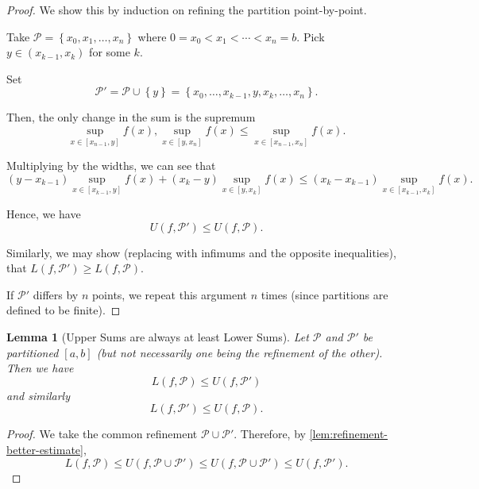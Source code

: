 \documentclass[11pt]{article}
\numberwithin{equation}{section}
\newtheorem{lemma}[theorem]{Lemma}
\theoremstyle{definition}
\theoremstyle{remark}
\newcommand{\pqty}[1]{\left(#1\right)}
\newcommand{\Bqty}[1]{\left\{#1\right\}}
\newcommand{\ccintv}[2]{[#1,#2]}
\newcommand{\oointv}[2]{(#1,#2)}
\newcommand{\partition}{\mathcal P}
\newcommand{\upperSum}{U}
\newcommand{\lowerSum}{L}
\begin{document}
\begin{proof}
    We show this by induction on refining the partition point-by-point.
    
    Take \(\partition = \Bqty{x_0, x_1, \ldots, x_n}\) where \(0 = x_0 < x_1 < \cdots < x_n = b\). Pick \(y \in \oointv{x_{k - 1}}{x_k}\) for some \(k\).

    Set
    \[
        \partition' = \partition \cup \Bqty{y} = \Bqty{x_0, \ldots, x_{k - 1}, y, x_k, \ldots, x_n}.
    \]

    Then, the only change in the sum is the supremum
    \[
        \sup_{x \in \ccintv{x_{n - 1}}{y}} f\pqty{x}, \sup_{x \in \ccintv{y}{x_n}} f\pqty{x} \leq \sup_{x \in \ccintv{x_{n - 1}}{x_n}} f\pqty{x}.
    \]

    Multiplying by the widths, we can see that
    \[
        \pqty{y - x_{k - 1}} \sup_{x \in \ccintv{x_{k - 1}}{y}} f\pqty{x} + \pqty{x_k - y} \sup_{x \in \ccintv{y}{x_k}} f\pqty{x} \leq \pqty{x_k - x_{k - 1}} \sup_{x \in \ccintv{x_{k - 1}}{x_k}} f\pqty{x}.
    \]

    Hence, we have
    \[
        \upperSum\pqty{f, \partition'} \leq \upperSum \pqty{f, \partition}.
    \]

    Similarly, we may show (replacing with infimums and the opposite inequalities), that
    \(
        \lowerSum\pqty{f, \partition'} \geq \lowerSum \pqty{f, \partition}.
    \)

    If \(\partition'\) differs by \(n\) points, we repeat this argument \(n\) times (since partitions are defined to be finite).
\end{proof}

\begin{lemma}[Upper Sums are always at least Lower Sums]\label{analysis-unit-0145}
    \label{lem:upper-greater-lower-sum}%
    Let \(\partition\) and \(\partition'\) be partitioned \(\ccintv{a}{b}\) (but not necessarily one being the refinement of the other). Then we have
    \[
        \lowerSum\pqty{f, \partition} \leq \upperSum\pqty{f, \partition'}
    \]
    and similarly
    \[
        \lowerSum\pqty{f, \partition'} \leq \upperSum\pqty{f, \partition}.
    \]
\end{lemma}

\begin{proof}
    We take the common refinement \(\partition \cup \partition'\). Therefore, by \autoref{lem:refinement-better-estimate},
    \[
        \lowerSum\pqty{f, \partition} \leq \upperSum\pqty{f, \partition \cup \partition'} \leq \upperSum\pqty{f, \partition \cup \partition'} \leq \upperSum\pqty{f, \partition'}.
    \]
\end{proof}
\end{document}
